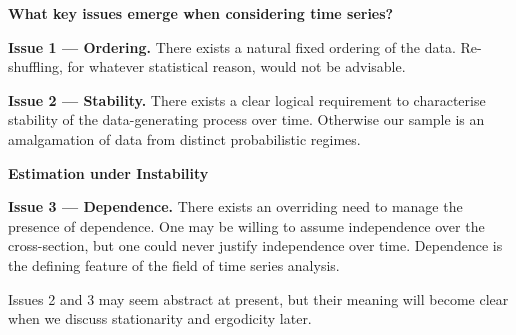 \documentclass[
  letterpaper,
  DIV=11,
  numbers=noendperiod]{scrartcl}
\newcommand{\slidelabel}[1]{{\color{embernavy}\bfseries\large #1\par\vspace{5pt}}}
\newenvironment{slidefooter}{%
  \par\vspace{7pt}{\color{emberrule}\rule{\linewidth}{0.4pt}}\par\vspace{4pt}%
  \color{emberamber}\itshape\small}{\par}
\begin{document}
\begin{slidebox}

\slidelabel{What key issues emerge when considering time series?}

\textbf{Issue 1 --- Ordering.} There exists a natural fixed ordering of
the data. Re-shuffling, for whatever statistical reason, would not be
advisable.

\textbf{Issue 2 --- Stability.} There exists a clear logical requirement
to characterise stability of the data-generating process over time.
Otherwise our sample is an amalgamation of data from distinct
probabilistic regimes.

\begin{tcolorbox}[enhanced jigsaw, arc=.35mm, bottomrule=.15mm, bottomtitle=1mm, breakable, colback=white, colbacktitle=quarto-callout-note-color!10!white, colframe=quarto-callout-note-color-frame, coltitle=black, left=2mm, leftrule=.75mm, opacityback=0, opacitybacktitle=0.6, rightrule=.15mm, title=\textcolor{quarto-callout-note-color}{\faInfo}\hspace{0.5em}{Watch: Illustration}, titlerule=0mm, toprule=.15mm, toptitle=1mm]

\textbf{Estimation under Instability}

\end{tcolorbox}

\textbf{Issue 3 --- Dependence.} There exists an overriding need to
manage the presence of dependence. One may be willing to assume
independence over the cross-section, but one could never justify
independence over time. Dependence is the defining feature of the field
of time series analysis.

\begin{slidefooter}

Issues 2 and 3 may seem abstract at present, but their meaning will
become clear when we discuss stationarity and ergodicity later.

\end{slidefooter}

\end{slidebox}
\end{document}
